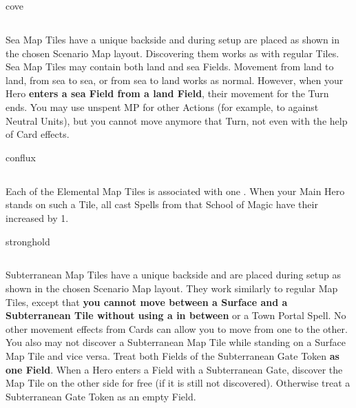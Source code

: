 \begin{multicols*}{2}
\begin{expansion}{cove}
  \subsection*{}
  Sea Map Tiles have a unique backside and during setup are placed as shown in the chosen Scenario Map layout.
  Discovering them works as with regular Tiles.
  Sea Map Tiles may contain both land and sea Fields.
  Movement from land to land, from sea to sea, or from sea to land works as normal.
  However, when your Hero \textbf{enters a sea Field from a land Field}, their movement for the Turn ends.
  You may use unspent MP for other Actions (for example, to  against Neutral Units), but you cannot move anymore that Turn, not even with the help of Card effects.
\end{expansion}

\bigskip

\begin{expansion}{conflux}
  \subsection*{}
  Each of the Elemental Map Tiles is associated with one .
  When your Main Hero stands on such a Tile, all cast Spells from that School of Magic have their  increased by 1.
\end{expansion}

\bigskip

\begin{expansion}{stronghold}
  \subsection*{}
  Subterranean Map Tiles have a unique backside and are placed during setup as shown in the chosen Scenario Map layout.
  They work similarly to regular Map Tiles, except that \textbf{you cannot move between a Surface and a Subterranean Tile without using a  in between} or a Town Portal Spell.
  No other movement effects from Cards can allow you to move from one to the other.
  You also may not discover a Subterranean Map Tile while standing on a Surface Map Tile and vice versa.
  Treat both Fields of the Subterranean Gate Token \textbf{as one Field}.
  When a Hero enters a Field with a Subterranean Gate, discover the Map Tile on the other side for free (if it is still not discovered).
  Otherwise treat a Subterranean Gate Token as an empty Field.
\end{expansion}


\end{multicols*}
